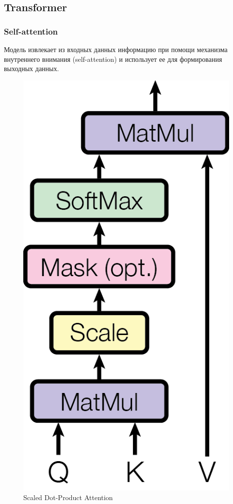 \documentclass[diploma]{nanolab2015}
\begin{document}
\subsection{Transformer}

\subsubsection{Self-attention}
Модель извлекает из входных данных информацию при помощи механизма внутреннего внимания (self-attention) и использует ее для формирования выходных данных.

\begin{figure}[ht]
    \centering
    \includegraphics[scale=0.2]{./assets/self-attention.png}
    \caption{Scaled Dot-Product Attention\cite{book10}}
    \label{pic3}
\end{figure}
\end{document}
